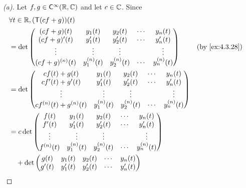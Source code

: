 \begin{proof}[(a)]
	Let \(f, g \in \cfs[\infty](\R, \C)\) and let \(c \in \mathbb{C}\).
	Since
	\begin{align*}
		 & \forall t \in \R, (\T(cf + g))(t)                                                                     \\
		 & = \det\begin{pmatrix}
			         (cf + g)(t)       & y_1(t)       & y_2(t)       & \cdots & y_n(t)       \\
			         (cf + g)'(t)      & y_1'(t)      & y_2'(t)      & \cdots & y_n'(t)      \\
			         \vdots            & \vdots       & \vdots       &        & \vdots       \\
			         (cf + g)^{(n)}(t) & y_1^{(n)}(t) & y_2^{(n)}(t) & \cdots & y_n^{(n)}(t)
		         \end{pmatrix}        &  & \by{ex:4.3.28}                         \\
		 & = \det\begin{pmatrix}
			         cf(t) + g(t)             & y_1(t)       & y_2(t)       & \cdots & y_n(t)       \\
			         cf'(t) + g'(t)           & y_1'(t)      & y_2'(t)      & \cdots & y_n'(t)      \\
			         \vdots                   & \vdots       & \vdots       &        & \vdots       \\
			         cf^{(n)}(t) + g^{(n)}(t) & y_1^{(n)}(t) & y_2^{(n)}(t) & \cdots & y_n^{(n)}(t)
		         \end{pmatrix}                  \\
		 & = c \det\begin{pmatrix}
			           f(t)       & y_1(t)       & y_2(t)       & \cdots & y_n(t)       \\
			           f'(t)      & y_1'(t)      & y_2'(t)      & \cdots & y_n'(t)      \\
			           \vdots     & \vdots       & \vdots       &        & \vdots       \\
			           f^{(n)}(t) & y_1^{(n)}(t) & y_2^{(n)}(t) & \cdots & y_n^{(n)}(t)
		           \end{pmatrix}                              \\
		 & \quad + \det\begin{pmatrix}
			               g(t)       & y_1(t)       & y_2(t)       & \cdots & y_n(t)       \\
			               g'(t)      & y_1'(t)      & y_2'(t)      & \cdots & y_n'(t)      \\

\end{pmatrix}
\end{align*}
\end{proof}
